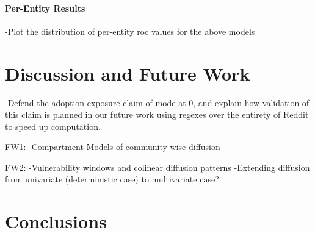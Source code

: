 \documentclass[journal,10pt,draftclsnofoot,onecolumn]{IEEEtran}
\begin{document}
\paragraph{Per-Entity Results}
-Plot the distribution of per-entity roc values for the above models

\section{Discussion and Future Work}
-Defend the adoption-exposure claim of mode at 0, and explain how validation of this claim is planned in our future work using regexes over the entirety of Reddit to speed up computation.

FW1:
-Compartment Models of community-wise diffusion

FW2:
-Vulnerability windows and colinear diffusion patterns
-Extending diffusion from univariate (deterministic case) to multivariate case?



\section{Conclusions}



%
\end{document}

